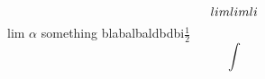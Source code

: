 \documentclass{ctexart}
\begin{document}
\begin{equation}
lim lim \vspace{\baselineskip} li
\end{equation}
lim $\alpha$ something blabalbaldbdbi$\frac{1}{2} $ 
\[ \int  
\]
\end{document}
